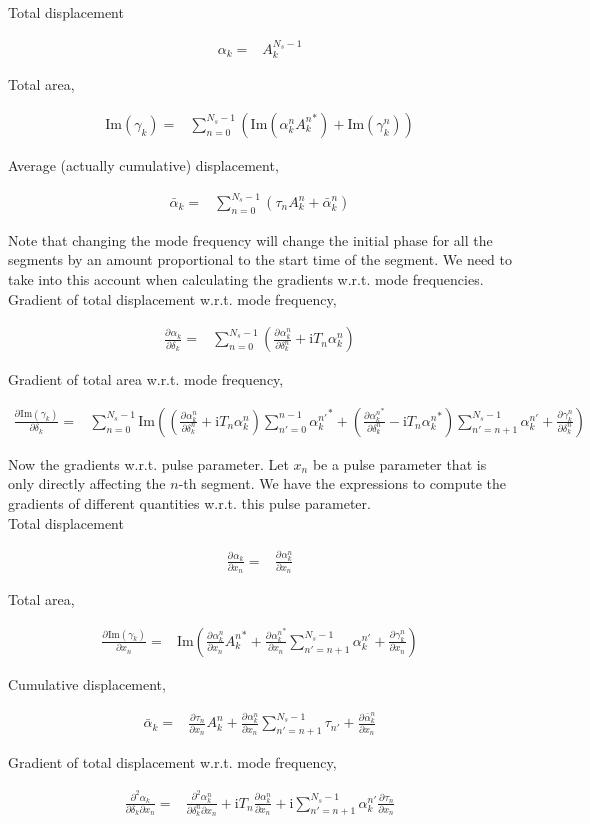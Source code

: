 \documentclass[10pt,fleqn]{article}
\newcommand{\ui}{\mathrm{i}}
\newcommand{\eqar}[1]
{
  \begin{align*}
    #1
  \end{align*}
}
\newcommand{\paren}[1]{{\left({#1}\right)}}
\newcommand{\pdiff}[3][{}]{{\frac{\partial^{#1} {#2}}{\partial {#3}{}^{#1}}}}
\begin{document}
Total displacement
\eqar{
  \alpha_k=&A_k^{N_s-1}
}

Total area,
\eqar{
  \mathrm{Im}(\gamma_k)=&\sum_{n=0}^{N_s-1}\!\!\paren{\mathrm{Im}\paren{\alpha_k^n{A_k^n}^*}+\mathrm{Im}(\gamma_k^n)}
}

Average (actually cumulative) displacement,
\eqar{
  \bar\alpha_k=&\sum_{n=0}^{N_s-1}\!\!\paren{\tau_n A_k^n+\bar\alpha_k^n}
}

Note that changing the mode frequency will change the initial phase for
all the segments by an amount proportional to the start time of the segment.
We need to take into this account when calculating the gradients
w.r.t. mode frequencies.\\

Gradient of total displacement w.r.t. mode frequency,
\eqar{
  \pdiff{\alpha_k}{\delta_k}=&\sum_{n=0}^{N_s-1}\!\!\paren{
    \pdiff{\alpha_k^n}{\delta_k^n}
    +\ui T_n\alpha_k^n
  }
}

Gradient of total area w.r.t. mode frequency,
\eqar{
  \pdiff{\mathrm{Im}(\gamma_k)}{\delta_k}=&\sum_{n=0}^{N_s-1}\!\!\mathrm{Im}\paren{
    \paren{\pdiff{\alpha_k^n}{\delta_k^n}+\ui T_n\alpha_k^n}
    \sum_{n'=0}^{n-1}\!\!{\alpha_k^{n'}}^*
    +\paren{\pdiff{{\alpha_k^n}^*}{\delta_k^n}-\ui T_n{\alpha_k^n}^*}\sum_{n'=n+1}^{N_s-1}\!\!\!\!\alpha_k^{n'}
    +\pdiff{\gamma_k^n}{\delta_k^n}}
}

Now the gradients w.r.t. pulse parameter.
Let $x_n$ be a pulse parameter that is only directly affecting the $n$-th segment.
We have the expressions to compute the gradients of different quantities
w.r.t. this pulse parameter.\\

Total displacement
\eqar{
  \pdiff{\alpha_k}{x_n}=&\pdiff{\alpha_k^n}{x_n}
}

Total area,
\eqar{
  \pdiff{\mathrm{Im}(\gamma_k)}{x_n}=&
  \mathrm{Im}\paren{\pdiff{\alpha_k^n}{x_n}{A_k^n}^*
    +\pdiff{{\alpha_k^n}^*}{x_n}\sum_{n'=n+1}^{N_s-1}\!\!\!\!\alpha_k^{n'}
    +\pdiff{\gamma_k^n}{x_n}
  }
}

Cumulative displacement,
\eqar{
  \bar\alpha_k=&
  \pdiff{\tau_n}{x_n}A_k^n
  +\pdiff{\alpha_k^n}{x_n}\!\!\sum_{n'=n+1}^{N_s-1}\!\!\!\!\tau_{n'}
  +\pdiff{\bar\alpha_k^n}{x_n}
}

Gradient of total displacement w.r.t. mode frequency,
\eqar{
  \frac{\partial^2\alpha_k}{\partial\delta_k\partial x_n}=&
  \frac{\partial^2\alpha_k^n}{\partial\delta_k^n\partial x_n}
  +\ui T_n\pdiff{\alpha_k^n}{x_n}
  +\ui\!\!\!\!\sum_{n'=n+1}^{N_s-1}\!\!\!\!\alpha_k^{n'}\pdiff{\tau_n}{x_n}
}
\end{document}
